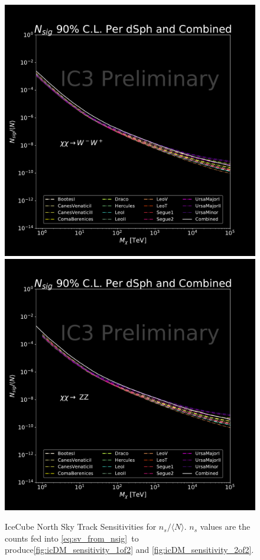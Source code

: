 \begin{figure}[h!]
{        \includegraphics[scale=0.265]{figures/ic_DM/dm_plots/WW_money_plot_comb_ns.pdf}
        \includegraphics[scale=0.265]{figures/ic_DM/dm_plots/ZZ_money_plot_comb_ns.pdf}
    }
    \caption{IceCube North Sky Track Sensitivities for $n_s / \langle N \rangle$. $n_s$ values are the counts fed into \cref{eq:sv_from_nsig}~to produce\cref{fig:icDM_sensitivity_1of2} and \cref{fig:icDM_sensitivity_2of2}.}
    \label{fig:icDM_NSsensitivity_1of2}
\end{figure}

